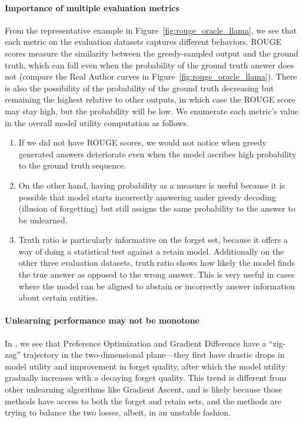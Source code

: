 \paragraph{Importance of multiple evaluation metrics}
From the representative example in Figure~\ref{fig:rouge_oracle_llama}, we see that each metric on the evaluation datasets captures different behaviors.
ROUGE scores measure the similarity between the greedy-sampled output and the ground truth, which can fall even when the probability of the ground truth answer does not (compare the Real Author curves in Figure~\ref{fig:rouge_oracle_llama}).
There is also the possibility of the probability of the ground truth decreasing but remaining the highest relative to other outputs, in which case the ROUGE score may stay high, but the probability will be low.
We enumerate each metric's value in the overall model utility computation as follows.
\begin{enumerate}
    \item If we did not have ROUGE scores, we would not notice when greedy generated answers deteriorate even when the model ascribes high probability to the ground truth sequence.
    \item On the other hand, having probability as a measure is useful because it is possible that model starts incorrectly answering under greedy decoding (illusion of forgetting) but still assigns the same probability to the answer to be unlearned.
    \item Truth ratio is particularly informative on the forget set, because it offers a way of doing a statistical test against a retain model. Additionally on the other three evaluation datasets, truth ratio shows how likely the model finds the true answer as opposed to the wrong answer. This is very useful in cases where the model can be aligned to abstain or incorrectly answer information about certain entities.
\end{enumerate}


\paragraph{Unlearning performance may not be monotone} In , we see that Preference Optimization and Gradient Difference have a ``zig-zag'' trajectory in the two-dimensional plane---they first have drastic drops in model utility and improvement in forget quality, after which the model utility gradually increases with a decaying forget quality. This trend is different from other unlearning algorithms like Gradient Ascent, and is likely because those methods have access to both the forget and retain sets, and the methods are trying to balance the two losses, albeit, in an unstable fashion.

    











